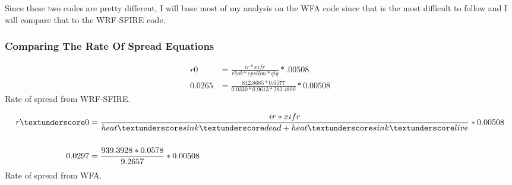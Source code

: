 \documentclass{article}
\newcommand\und{\textunderscore}
\begin{document}
	Since these two codes are pretty different, I will base most of my analysis on the WFA code since that is the most difficult to follow and I will compare that to the WRF-SFIRE code. 

\iffalse
\subsubsection*{Fuel Load}
In the WFA code, there are 6 different fuel loads that are used across the model whereas the WRF-SFIRE code only uses one fuel load. With the base equations that require only one fuel load (equation \ref{rhob_WFA} and\ref{betafl_WFA}). To obtain a single fuel load, the WFA code adds all the fuel loads together. In the WRF-SFIRE code, the fuel load is one value (that is given in the fuel parameters) and it is used in equation \ref{fuelloadm}, equation \ref{betafl_WRF}, and equation \ref{wn_WRF}. With different fuel loads, that impacts the overall model since these different fuel loads are used in the calculations of the mean total surface area per unit fuel cell (equation \ref{mean_total_surface_area}), net fuel loading of each size class (equation \ref{size_class}), the net fuel loading of each size class (equation \ref{net_fuel_load_each_class}), and the live fuel moisture of extinction (equation \ref{live_fmc_ext})
\fi

\subsubsection{Comparing The Rate Of Spread Equations}

\begin{equation}
	\label{WRF-ROS}
	\begin{split}
		r0 &= \frac{ir*xifr}{rhob * epsilon *qig} * .00508 \\
		0.0265 &= \frac{812.8685 * 0.0577}{0.0330 * 0.9613 * 283.4800} * 0.00508
	\end{split}
\end{equation}
Rate of spread from WRF-SFIRE. 

	\begin{equation}
	\label{r0_WFA_2}
	\begin{split}
	r\und 0 &= \frac{ir * xifr}{heat\und sink\und dead + heat\und sink\und live} * 0.00508 \\
	\\
	0.0297 &= \frac{939.3928 * 0.0578}{9.2657} * 0.00508
	\end{split}
\end{equation}
Rate of spread from WFA. \\
\end{document}
